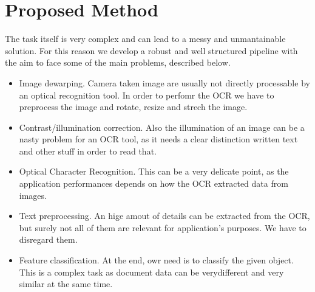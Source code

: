 \documentclass[10pt,twocolumn,letterpaper]{article}
\begin{document}

\section{Proposed Method}
\label{sec:proposed-method}

The task itself is very complex and can lead to a messy and
unmantainable solution. For this reason we develop a robust and well
structured pipeline with the aim to face some of the main problems,
described below.
\begin{itemize}
	\item Image dewarping. Camera taken image are usually not directly
	processable by an optical recognition tool. In order to perfomr
	the OCR we have to preprocess the image and rotate, resize and
	strech the image.
	\item Contrast/illumination correction. Also the illumination of an
	image can be a nasty problem for an OCR tool, as it needs a clear
	distinction written text and other stuff in order to read that.
	\item Optical Character Recognition. This can be a very delicate
	point, as the application performances depends on how the OCR
	extracted data from images.
	\item Text preprocessing. An hige amout of details can be extracted
	from the OCR, but surely not all of them are relevant for
	application's purposes. We have to disregard them.
	\item Feature classification. At the end, owr need is to classify the
	given object. This is a complex task as document data can be verydifferent and very similar at the same time.
\end{itemize}
\end{document}

